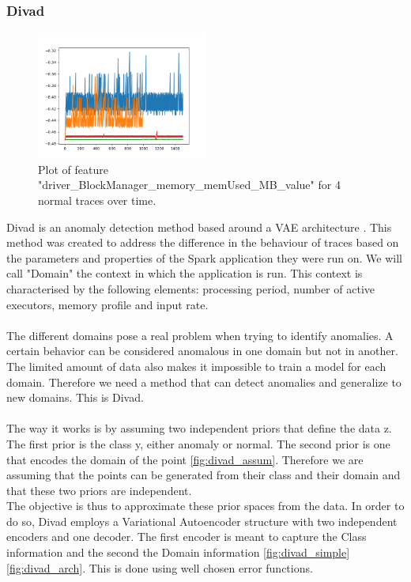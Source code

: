 \documentclass[oneside, a4paper, onecolumn, 11pt]{article}
\begin{document}
\subsubsection{Divad}
\label{subsec:divad_domain}
\begin{figure}[h]
  \centering
  \includegraphics[width=0.5\textwidth]{images/domains.png}
  \caption{Plot of feature "driver\_BlockManager\_memory\_memUsed\_MB\_value" for 4 normal traces over time.}
  \label{fig:domains}
\end{figure}
Divad is an anomaly detection method based around a VAE architecture \cite{Divad}. This method was created to address the difference in the behaviour of traces based on the parameters and properties of the Spark application they were run on. We will call "Domain" the context in which the application is run. This context is characterised by the following elements: processing period, number of active executors, memory profile and input rate.\\\\
The different domains pose a real problem when trying to identify anomalies. A certain behavior can be considered anomalous in one domain but not in another.
The limited amount of data also makes it impossible to train a model for each domain. Therefore we need a method that can detect anomalies and generalize to new domains. This is Divad.\\\\
The way it works is by assuming two independent priors that define the data z. The first prior is the class y, either anomaly or normal. The second prior is one that encodes the domain of the point \autoref{fig:divad_assum}. Therefore we are assuming that the points can be generated from their class and their domain and that these two priors are independent.\\
The objective is thus to approximate these prior spaces from the data. In order to do so, Divad employs a Variational Autoencoder structure with two independent encoders and one decoder. The first encoder is meant to capture the Class information and the second the Domain information \autoref{fig:divad_simple} \autoref{fig:divad_arch}. This is done using well chosen error functions.\\
\end{document}
